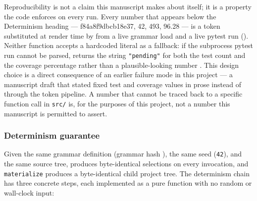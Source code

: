 \documentclass[
]{article}
\begin{document}
Reproducibility is not a claim this manuscript makes about itself; it is
a property the code enforces on every run. Every number that appears
below the Determinism heading --- f84a8f9dbcb18e37, 42, 493, 96.28 ---
is a token substituted at render time by
 from a live
grammar load and a live pytest run
().
Neither function accepts a hardcoded literal as a fallback: if the
subprocess pytest run cannot be parsed, 
returns the string \texttt{"pending"} for both the test count and the
coverage percentage rather than a plausible-looking number
\citep{reproducible_builds}. This design choice is a direct consequence
of an earlier failure mode in this project --- a manuscript draft that
stated fixed test and coverage values in prose instead of through the
token pipeline. A number that cannot be traced back to a specific
function call in \texttt{src/} is, for the purposes of this project, not
a number this manuscript is permitted to assert.

\subsubsection{Determinism guarantee}\label{determinism-guarantee}

Given the same  grammar definition
(grammar hash ), the same seed (\texttt{42}),
and the same  source tree,
 produces byte-identical
selections on every invocation, and \texttt{materialize} produces a
byte-identical child project tree. The determinism chain has three
concrete steps, each implemented as a pure function with no random or
wall-clock input:
\end{document}
